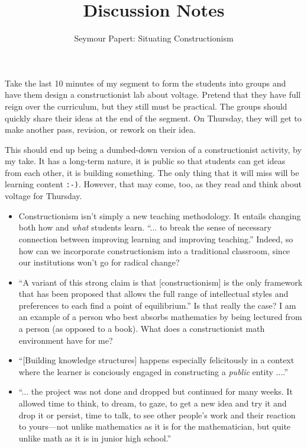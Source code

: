 \documentclass[12pt]{article}
\title{Discussion Notes}
\author{Seymour Papert: Situating Constructionism}
\date{}
\begin{document}
\maketitle

Take the last 10 minutes of my segment to form the students into groups
and have them design a constructionist lab about voltage.  Pretend that
they have full reign over the curriculum, but they still must be
practical.  The groups should quickly share their ideas at the end of
the segment.  On Thursday, they will get to make another pass, revision,
or rework on their idea.

This should end up being a dumbed-down version of a constructionist
activity, by my take.   It has a long-term nature, it is public so that
students can get ideas from each other, it is building something.  The
only thing that it will miss will be learning content \texttt{:-)}.
However, that may come, too, as they read and think about voltage for
Thursday.

\begin{itemize}
\item Constructionism isn't simply a new teaching methodology.  It
entails changing both how and \textit{what} students learn.  ``... to
break the sense of necessary connection between improving learning and
improving teaching.''  Indeed, so how can we incorporate constructionism
into a traditional classroom, since our institutions won't go for
radical change?

\item ``A variant of this strong claim is that [constructionism] is the
only framework that has been proposed that allows the full range of
intellectual styles and preferences to each find a point of
equilibrium.''  Is that really the case?  I am an example of a person
who best absorbs mathematics by being lectured from a person (as opposed
to a book).  What does a constructionist math environment have for me?

\item ``[Building knowledge structures] happens especially felicitously
in a context where the learner is conciously engaged in constructing a
\textit{public} entity ....''

\item ``... the project was not done and dropped but continued for many
weeks.  It allowed time to think, to dream, to gaze, to get a new idea
and try it and drop it or persist, time to talk, to see other people's
work and their reaction to yours---not unlike mathematics as it is for
the mathematician, but quite unlike math as it is in junior high
school.''

\end{itemize}
\end{document}

